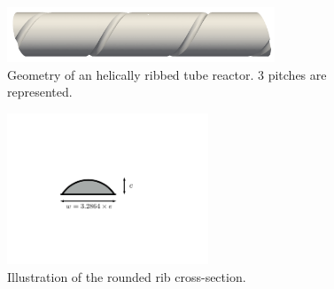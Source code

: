 \begin{figure}[ht]
\centering
\includegraphics[width=8cm]{fig/applications/optim/geometry.png}
\caption{Geometry of an helically ribbed tube reactor. 3 pitches are represented.}
\label{geometry}
\end{figure}

\begin{figure}[ht]
\centering
\includegraphics[width=6cm]{fig/applications/optim/rib_shape.pdf}
\caption{Illustration of the rounded rib cross-section.}
\label{rib}
\end{figure}


